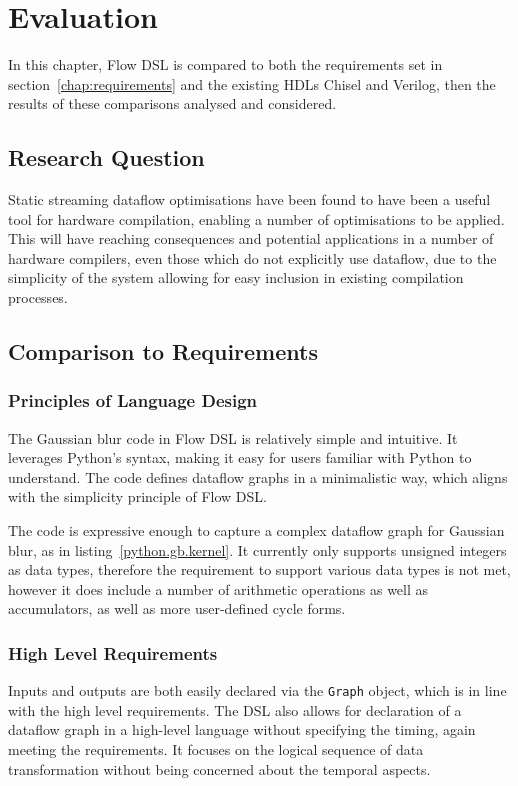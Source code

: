 \chapter{Evaluation}
In this chapter, Flow DSL is compared to both the requirements set in section \ref{chap:requirements} and the existing HDLs Chisel and Verilog, then the results of these comparisons analysed and considered.

\section{Research Question}
Static streaming dataflow optimisations have been found to have been a useful tool for hardware compilation, enabling a number of optimisations to be applied. This will have reaching consequences and potential applications in a number of hardware compilers, even those which do not explicitly use dataflow, due to the simplicity of the system allowing for easy inclusion in existing compilation processes.

\section{Comparison to Requirements}
\subsection{Principles of Language Design}
The Gaussian blur code in Flow DSL is relatively simple and intuitive. It leverages Python's syntax, making it easy for users familiar with Python to understand. The code defines dataflow graphs in a minimalistic way, which aligns with the simplicity principle of Flow DSL.

The code is expressive enough to capture a complex dataflow graph for Gaussian blur, as in listing \ref{python.gb.kernel}. It currently only supports unsigned integers as data types, therefore the requirement to support various data types is not met, however it does include a number of arithmetic operations as well as accumulators, as well as more user-defined cycle forms.

\subsection{High Level Requirements}
Inputs and outputs are both easily declared via the \lstinline|Graph| object, which is in line with the high level requirements. The DSL also allows for declaration of a dataflow graph in a high-level language without specifying the timing, again meeting the requirements. It focuses on the logical sequence of data transformation without being concerned about the temporal aspects.

